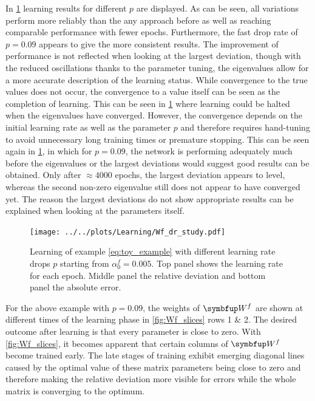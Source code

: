 In \cref{fig:dr_fast_study} learning results for different $p$ are displayed. As can be seen, all variations perform more reliably than the any approach before as well as reaching comparable performance with fewer epochs. Furthermore, the fast drop rate of $p = 0.09$ appears to give the more consistent results. The improvement of performance is not reflected when looking at the largest deviation, though with the reduced oscillations thanks to the parameter tuning, the eigenvalues allow for a more accurate description of the learning status. While convergence to the true values does not occur, the convergence to a value itself can be seen as the completion of learning. This can be seen in \cref{fig:dr_fast_study} where learning could be halted when the eigenvalues have converged. However, the convergence depends on the initial learning rate as well as the parameter $p$ and therefore requires hand-tuning to avoid unnecessary long training times or premature stopping. This can be seen again in \cref{fig:dr_fast_study}, in which for $p = 0.09$, the network is performing adequately much before the eigenvalues or the largest deviations would suggest good results can be obtained. Only after $\approx 4000$ epochs, the largest deviation appears to level, whereas the second non-zero eigenvalue still does not appear to have converged yet. The reason the largest deviations do not show appropriate results can be explained when looking at the parameters itself.\\
\begin{figure}
	\centering
	\texttt{[image: ../../plots/Learning/Wf\_dr\_study.pdf]}
	\caption{Learning of example \cref{eq:toy_example} with different learning rate drops $p$ starting from $\alpha^f_0 = 0.005$. Top panel shows the learning rate for each epoch. Middle panel the relative deviation and bottom panel the absolute error.}
	\label{fig:dr_fast_study}
\end{figure}
For the above example with $p = 0.09$, the weights of $\bmu{W}^f$ are shown at different times of the learning phase in \cref{fig:Wf_slices} rows 1 \& 2. The desired outcome after learning is that every parameter is close to zero. With \cref{fig:Wf_slices}, it becomes apparent that certain columns of $\bmu{W}^f$ become trained early. The late stages of training exhibit emerging diagonal lines caused by the optimal value of these matrix parameters being close to zero and therefore making the relative deviation more visible for errors while the whole matrix is converging to the optimum.\\

